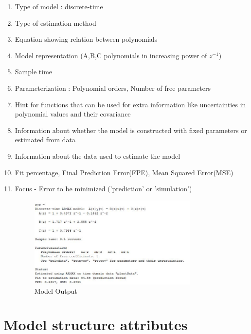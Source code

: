 \documentclass[a4paper,12pt]{report}
\begin{document}
	\begin{enumerate}
		\item Type of model : discrete-time
		\item Type of estimation method 
		\item Equation showing relation between polynomials  
		\item Model representation (A,B,C polynomials in increasing power of $z^{-1}$)
			
		\item Sample time
		
		\item Parameterization : Polynomial orders, Number of free parameters
		\item Hint for functions that can be used for extra information like uncertainties in polynomial values and their covariance 
		\item Information about whether the model is constructed with fixed parameters or estimated from data
		\item Information about the data used to estimate the model
		\item Fit percentage, Final Prediction Error(FPE), Mean Squared Error(MSE)
		\item Focus -  Error to be minimized ('prediction' or 'simulation')
	
			
			
			
			
			
			\begin{figure}[tbp]
				\centering
				\includegraphics[width=0.8\textwidth]{modMat1.JPG}
				\caption{Model Output}
				\label{}
			\end{figure}
			
		\end{enumerate}	
			
		\section{Model structure attributes}	
			
\end{document}
